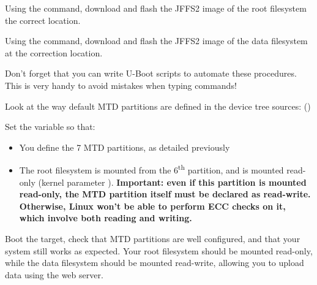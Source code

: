 Using the  command, download and flash the JFFS2 image
of the root filesystem the correct location.

Using the  command, download and flash the JFFS2 image of the
data filesystem at the correction location.

Don't forget that you can write U-Boot scripts to automate these
procedures. This is very handy to avoid mistakes when typing commands!

Look at the way default MTD partitions are defined in the device tree
sources: ()

Set the  variable so that:

\begin{itemize}
\item You define the 7 MTD partitions, as detailed previously
\item The root filesystem is mounted from the 6\textsuperscript{th}
  partition, and is mounted read-only (kernel parameter ).
  {\bf Important: even if this partition is mounted read-only, the
  MTD partition itself must be declared as read-write. Otherwise,
  Linux won't be able to perform ECC checks on it, which involve
  both reading and writing.}
\end{itemize}

Boot the target, check that MTD partitions are well configured, and
that your system still works as expected. Your root filesystem should
be mounted read-only, while the data filesystem should be mounted
read-write, allowing you to upload data using the web server.
